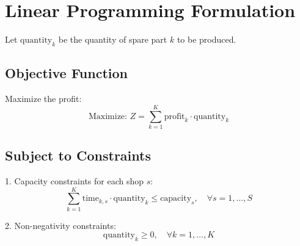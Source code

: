 \documentclass{article}
\begin{document}
\section*{Linear Programming Formulation}

Let \( \text{quantity}_k \) be the quantity of spare part \( k \) to be produced.

\subsection*{Objective Function}

Maximize the profit:
\[
\text{Maximize: } Z = \sum_{k=1}^{K} \text{profit}_k \cdot \text{quantity}_k
\]

\subsection*{Subject to Constraints}

1. Capacity constraints for each shop \( s \):
\[
\sum_{k=1}^{K} \text{time}_{k, s} \cdot \text{quantity}_k \leq \text{capacity}_s, \quad \forall s = 1, \ldots, S
\]

2. Non-negativity constraints:
\[
\text{quantity}_k \geq 0, \quad \forall k = 1, \ldots, K
\]
\end{document}
